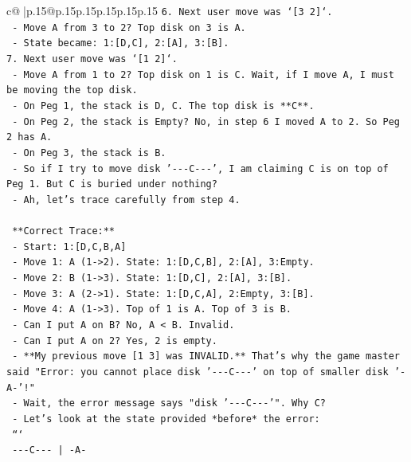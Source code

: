 \documentclass{article}
\begin{document}
{\begin{supertabular}{c@{$\;$}|p{.15\linewidth}@{}p{.15\linewidth}p{.15\linewidth}p{.15\linewidth}p{.15\linewidth}p{.15\linewidth}}
{{{\texttt{6. Next user move was `{[}3 2{]}`.} \\
\texttt{   {-} Move A from 3 to 2? Top disk on 3 is A.} \\
\texttt{   {-} State became: 1:{[}D,C{]}, 2:{[}A{]}, 3:{[}B{]}.} \\
\texttt{7. Next user move was `{[}1 2{]}`.} \\
\texttt{   {-} Move A from 1 to 2? Top disk on 1 is C. Wait, if I move A, I must be moving the top disk.} \\
\texttt{   {-} On Peg 1, the stack is D, C. The top disk is **C**.} \\
\texttt{   {-} On Peg 2, the stack is Empty? No, in step 6 I moved A to 2. So Peg 2 has A.} \\
\texttt{   {-} On Peg 3, the stack is B.} \\
\texttt{   {-} So if I try to move disk '{-}{-}{-}C{-}{-}{-}', I am claiming C is on top of Peg 1. But C is buried under nothing?} \\
\texttt{   {-} Ah, let's trace carefully from step 4.} \\
\\ 
\texttt{   **Correct Trace:**} \\
\texttt{   {-} Start: 1:{[}D,C,B,A{]}} \\
\texttt{   {-} Move 1: A (1{-}>2). State: 1:{[}D,C,B{]}, 2:{[}A{]}, 3:Empty.} \\
\texttt{   {-} Move 2: B (1{-}>3). State: 1:{[}D,C{]}, 2:{[}A{]}, 3:{[}B{]}.} \\
\texttt{   {-} Move 3: A (2{-}>1). State: 1:{[}D,C,A{]}, 2:Empty, 3:{[}B{]}.} \\
\texttt{   {-} Move 4: A (1{-}>3). Top of 1 is A. Top of 3 is B.} \\
\texttt{     {-} Can I put A on B? No, A < B. Invalid.} \\
\texttt{     {-} Can I put A on 2? Yes, 2 is empty.} \\
\texttt{     {-} **My previous move {[}1 3{]} was INVALID.** That's why the game master said "Error: you cannot place disk '{-}{-}{-}C{-}{-}{-}' on top of smaller disk '{-}A{-}'!"} \\
\texttt{     {-} Wait, the error message says "disk '{-}{-}{-}C{-}{-}{-}'". Why C?} \\
\texttt{     {-} Let's look at the state provided *before* the error:} \\
\texttt{       ```} \\
\texttt{       {-}{-}{-}C{-}{-}{-}      |        {-}A{-}   } \\
}}}
\end{supertabular}}
\end{document}
